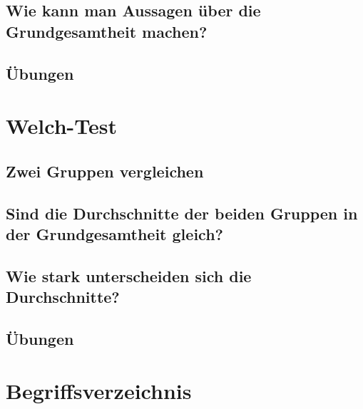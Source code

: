 \documentclass[
]{book}
\theoremstyle{definition}
\theoremstyle{definition}
\theoremstyle{definition}
\theoremstyle{definition}
\theoremstyle{remark}
\begin{document}
\section{Wie kann man Aussagen über die Grundgesamtheit machen?}\label{wie-kann-man-aussagen-uxfcber-die-grundgesamtheit-machen}

\section{Übungen}\label{uxfcbungen-3}

\chapter{Welch-Test}\label{welch-test}

\section{Zwei Gruppen vergleichen}\label{zwei-gruppen-vergleichen-1}

\section{Sind die Durchschnitte der beiden Gruppen in der Grundgesamtheit gleich?}\label{sind-die-durchschnitte-der-beiden-gruppen-in-der-grundgesamtheit-gleich}

\section{Wie stark unterscheiden sich die Durchschnitte?}\label{wie-stark-unterscheiden-sich-die-durchschnitte}

\section{Übungen}\label{uxfcbungen-4}

\chapter*{Begriffsverzeichnis}\label{begriffsverzeichnis}
\end{document}
